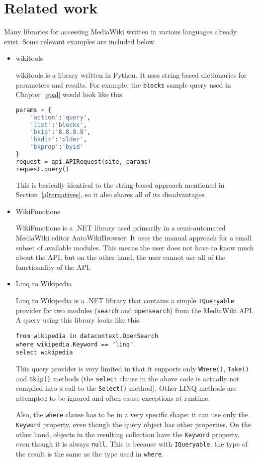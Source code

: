 \chapter{Related work}
\label{related}

Many libraries for accessing MediaWiki written in various languages already exist.
Some relevant examples are included below.

\begin{itemize}
\item wikitools \cite{wikitools}

wikitools is a library written in Python. It uses string-based dictionaries for parameters and results.
For example, the \texttt{blocks} sample query used in Chapter~\ref{goal} would look like this:

\begin{lstlisting}[language=python]
params = {
    'action':'query',
    'list':'blocks',
    'bkip':'8.8.8.8',
    'bkdir':'older',
    'bkprop':'byid'
}
request = api.APIRequest(site, params)
request.query()
\end{lstlisting}

This is basically identical to the string-based approach mentioned in Section~\ref{alternatives},
so it also shares all of its disadvantages.

\item WikiFunctions \cite{wikifunctions}

WikiFunctions is a .NET library used primarily in a semi-automated MediaWiki editor AutoWikiBrowser.
It uses the manual approach for a small subset of available modules.
This means the user does not have to know much about the API,
but on the other hand, the user cannot use all of the functionality of the API.

\item Linq to Wikipedia \cite{linq-to-wikipedia}

Linq to Wikipedia is a .NET library that contains a simple \lstinline{IQueryable} provider for two modules
(\texttt{search} and \texttt{opensearch}) from the MediaWiki API.
A query using this library looks like this:

\begin{lstlisting}
from wikipedia in datacontext.OpenSearch
where wikipedia.Keyword == "linq"
select wikipedia
\end{lstlisting}

This query provider is very limited in that it supports
only \lstinline{Where()}, \lstinline{Take()} and \lstinline{Skip()} methods
(the \lstinline{select} clause in the above code is actually not compiled into a call to the \lstinline{Select()} method).
Other LINQ methods are attempted to be ignored and often cause exceptions at runtime.

Also, the \lstinline{where} clause has to be in a very specific shape:
it can use only the \lstinline{Keyword} property, even though the query object has other properties.
On the other hand, objects in the resulting collection have the \lstinline{Keyword} property,
even though it is always \lstinline{null}.
This is because with \lstinline{IQueryable}, the type of the result is the same as the type used in \lstinline{where}.

\end{itemize}